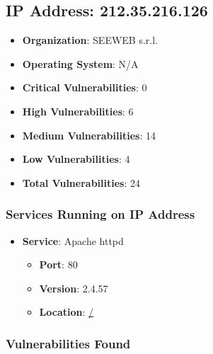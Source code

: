 \documentclass{article}
\begin{document}
\clearpage



\subsection{IP Address: 212.35.216.126}

\begin{itemize}
    \item \textbf{Organization}: SEEWEB s.r.l.
    \item \textbf{Operating System}:  N/A 
    \item \textbf{Critical Vulnerabilities}: 0
    \item \textbf{High Vulnerabilities}: 6
    \item \textbf{Medium Vulnerabilities}: 14
    \item \textbf{Low Vulnerabilities}: 4
    \item \textbf{Total Vulnerabilities}: 24
\end{itemize}

\subsubsection*{Services Running on IP Address}

\begin{itemize}
    
        \item \textbf{Service}: Apache httpd
        \begin{itemize}
            \item \textbf{Port}: 80
            \item \textbf{Version}:  2.4.57 
            \item \textbf{Location}: \href{ / }{ / }
        \end{itemize}
    
\end{itemize}


\subsubsection*{Vulnerabilities Found}
\end{document}
